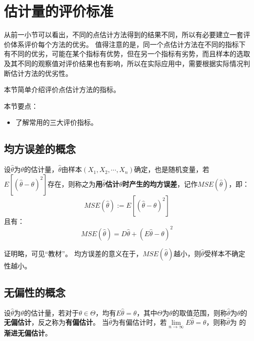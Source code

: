 \section{估计量的评价标准}

\begin{tcolorbox}
从前一小节可以看出，不同的点估计方法得到的结果不同，所以有必要建立一套评价体系评价每个方法的优劣。
值得注意的是，同一个点估计方法在不同的指标下有不同的优劣，可能在某个指标有优势，但在另一个指标有劣势，而且样本的选取及其不同的观察值对评价结果也有影响，所以在实际应用中，需要根据实际情况判断估计方法的优劣性。
\end{tcolorbox}

本节简单介绍评价点估计方法的指标。

本节要点：
\begin{itemize}
    \item 了解常用的三大评价指标。
\end{itemize}

\subsection{均方误差的概念}

\begin{definition}[均方误差]
设$\hat{\theta}$为$\theta $的估计量，$\hat{\theta}$由样本$\left( X_1,X_2,\cdots ,X_n \right) $确定，也是随机变量，若$E\left[ \left( \hat{\theta}-\theta \right) ^2 \right] $存在，则称之为{\bf 用$\hat{\theta}$估计$\theta $时产生的均方误差}，记作$MSE\left( \hat{\theta} \right) $，即：
\[
MSE\left( \hat{\theta} \right) :=E\left[ \left( \hat{\theta}-\theta \right) ^2 \right]
\]
且有：
\[
MSE\left( \hat{\theta} \right) =D\hat{\theta}+\left( E\hat{\theta}-\theta \right) ^2
\]
\end{definition}

证明略，可见“教材\cite{book1}”。
均方误差的意义在于，$MSE\left( \hat{\theta} \right) $越小，则$\hat{\theta}$受样本不确定性越小。

\subsection{无偏性的概念}

\begin{definition}[无偏性]
设$\hat{\theta}$为$\theta $的估计量，若对于$\theta \in \varTheta $，均有$E\hat{\theta}=\theta $，其中$\varTheta $为$\theta $的取值范围，则称$\hat{\theta}$为$\theta $的{\bf 无偏估计}，反之称为{\bf 有偏估计}。
当$\hat{\theta}$为有偏估计时，若$\underset{n\rightarrow \infty}{\lim}E\hat{\theta}=\theta $，则称$\hat{\theta}$为 的{\bf 渐进无偏估计}。
\end{definition}

